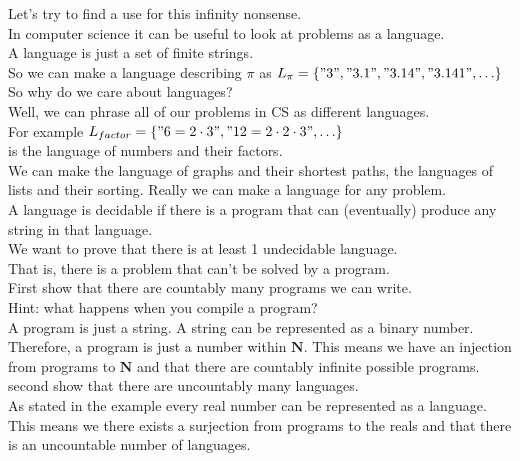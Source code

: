 \documentclass{exam}
\newcommand\N{\mathbf{N}}
\begin{document}
\begin{questions}
Let's try to find a use for this infinity nonsense.\\
$\ $\\
In computer science it can be useful to look at problems as a language.\\
A language is just a set of finite strings.\\
So we can make a language describing $\pi$ as $L_\pi = \{"3", "3.1", "3.14", "3.141", \ldots\}$\\
$\ $\\
So why do we care about languages?\\
Well, we can phrase all of our problems in CS as different languages.\\
For example $L_{factor} = \{"6=2\cdot3", "12=2\cdot2\cdot3", \ldots\}$\\
is the language of numbers and their factors.\\
We can make the language of graphs and their shortest paths, the languages of lists and their sorting.
Really we can make a language for any problem.\\
$\ $\\
A language is decidable if there is a program that can (eventually) produce any string in that language.\\
$\ $\\
We want to prove that there is at least 1 undecidable language.\\
That is, there is a problem that can't be solved by a program.\\
$\ $\\
First show that there are countably many programs we can write.\\
Hint: what happens when you compile a program?\\
A program is just a string. A string can be represented as a binary number. Therefore, a program is just a number within $\N$. This means we have an injection from programs to $\N$ and that there are countably infinite possible programs. \\
second show that there are uncountably many languages.\\
As stated in the example every real number can be represented as a language. This means we there exists a surjection from programs to the reals and that there is an uncountable number of languages.

\end{questions}
\end{document}
